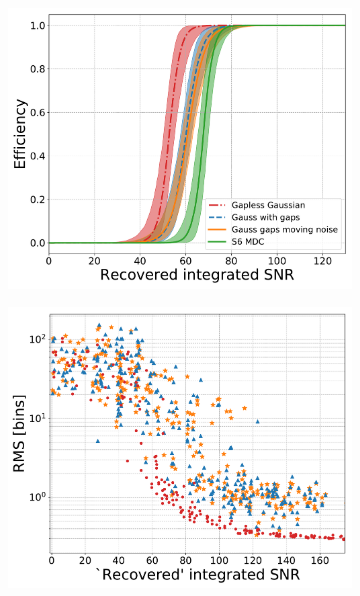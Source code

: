 \begin{figure}[p]
\centering
\begin{subfigure}[h]{0.49\columnwidth}
\centering
\includegraphics[scale=0.3]{C3_soap/s6_efficiency_snr.pdf}
\subcaption{}
\label{soap:results:gausss6:eff_snr}
\end{subfigure}
\begin{subfigure}[h]{0.49\columnwidth}
\includegraphics[scale=0.3]{C3_soap/gauss_s6_frac_snr.pdf}
\subcaption{}
\label{soap:results:gausss6:res_snr}
\end{subfigure}


\end{figure}
